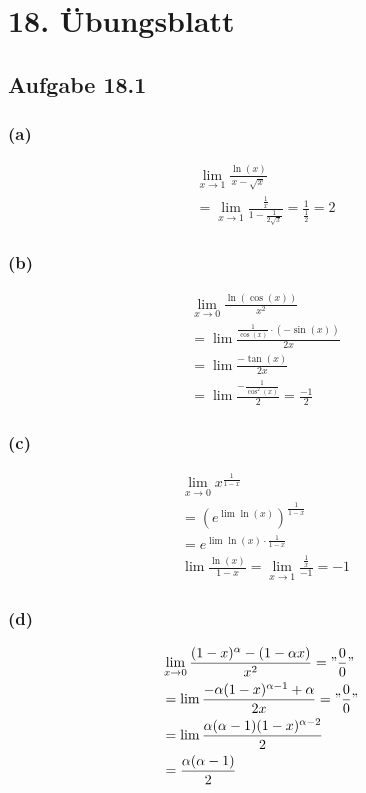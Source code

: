 \section{18. Übungsblatt}

\subsection{Aufgabe 18.1}

\subsubsection{(a)}
\begin{align*}
&\lim_{x\rightarrow 1}\frac{\ln(x)}{x-\sqrt{x}}\\
&=\lim_{x\rightarrow1}\frac{\frac{1}{x}}{1-\frac{1}{2\sqrt{x}}}=\frac{1}{\frac{1}{2}}=2
\end{align*}

\subsubsection{(b)}
\begin{align*}
&\lim_{x\rightarrow0}\frac{\ln(\cos(x))}{x^2}\\
&=\lim\frac{\frac{1}{\cos(x)}\cdot(-\sin(x))}{2x}\\
&=\lim\frac{-\tan(x)}{2x}\\
&=\lim\frac{-\frac{1}{\cos^2(x)}}{2}=\frac{-1}{2}
\end{align*}

\subsubsection{(c)}
\begin{align*}
&\lim_{x\rightarrow0}x^{\frac{1}{1-x}}\\
&=(e^{\lim \ln(x)})^{\frac{1}{1-x}}\\
&=e^{\lim\ln(x)\cdot\frac{1}{1-x}}\\
&\lim\frac{\ln(x)}{1-x}=\lim_{x\rightarrow1}\frac{\frac{1}{x}}{-1}=-1
\end{align*}

\subsubsection{(d)}
\begin{align*}
&\lim_{x\rightarrow0}\frac{(1-x)^\alpha-(1-\alpha x)}{x^2}="\frac{0}{0}"\\
&=\lim\frac{-\alpha(1-x)^{\alpha-1}+\alpha}{2x}="\frac{0}{0}"\\
&=\lim\frac{\alpha(\alpha-1)(1-x)^{\alpha-2}}{2}\\
&=\frac{\alpha(\alpha-1)}{2}
\end{align*}


